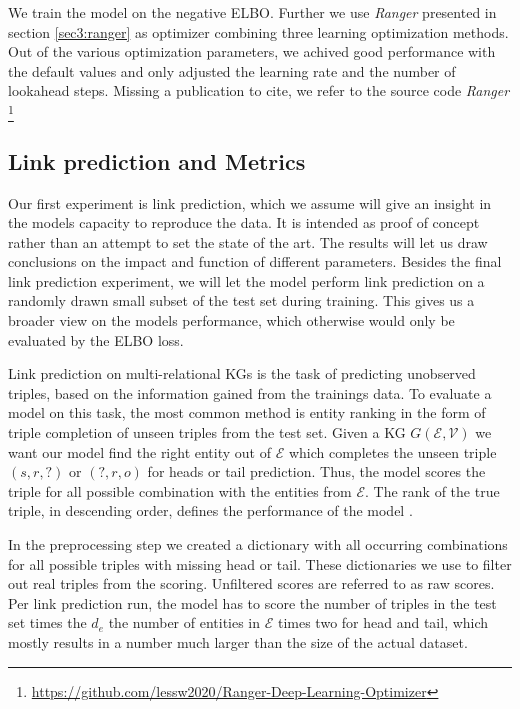 We train the model on the negative ELBO. Further we use \textit{Ranger} presented in section \ref{sec3:ranger} as optimizer combining three learning optimization methods. Out of the various optimization parameters, we achived good performance with the default values and  only adjusted the learning rate and the number of lookahead steps. Missing a publication to cite, we refer to the source code \textit{Ranger} \footnote{\url{https://github.com/lessw2020/Ranger-Deep-Learning-Optimizer}}



\subsection{Link prediction and Metrics}
\label{ssec4:lpmetrics}
Our first experiment is link prediction, which we assume will give an insight in the models capacity to reproduce the data. It is intended as proof of concept rather than an attempt to set the state of the art. The results will let us draw conclusions on the impact and function of different parameters.
Besides the final link prediction experiment, we will let the model perform link prediction on a randomly drawn small subset of the test set during training. This gives us a broader view on the models performance, which otherwise would only be evaluated by the ELBO loss.  

Link prediction on multi-relational KGs is the task of predicting unobserved triples, based on the information gained from the trainings data. To evaluate a model on this task, the most common method is entity ranking in the form of triple completion of unseen triples from the test set. Given a KG $G(\mathcal{E},\mathcal{V})$ we want our model find the right entity out of $\mathcal{E}$ which completes the unseen triple $(s,r,?)$ or $(?,r,o)$ for heads or tail prediction. Thus, the model scores the triple for all possible combination with the entities from $\mathcal{E}$. The rank of the true triple, in descending order, defines the performance of the model \cite{ruffinelli_you_2019}.

In the preprocessing step we created a dictionary with all occurring combinations for all possible triples with missing head or tail. These dictionaries we use to filter out real triples from the scoring. Unfiltered scores are referred to as raw scores. Per link prediction run, the model has to score the number of triples in the test set times the $d_e$ the number of entities in $\mathcal{E}$ times two for head and tail, which mostly results in a number much larger than the size of the actual dataset.

